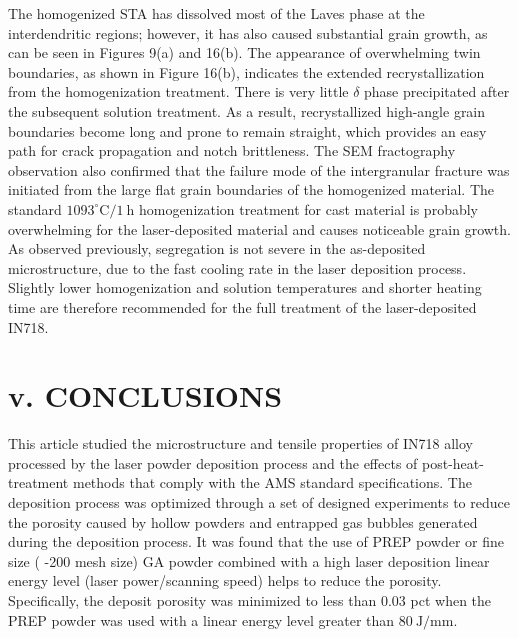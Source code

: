\documentclass[10pt]{article}
\begin{document}
The homogenized STA has dissolved most of the Laves phase at the interdendritic regions; however, it has also caused substantial grain growth, as can be seen in Figures 9(a) and 16(b). The appearance of overwhelming twin boundaries, as shown in Figure 16(b), indicates the extended recrystallization from the homogenization treatment. There is very little $\delta$ phase precipitated after the subsequent solution treatment. As a result, recrystallized high-angle grain boundaries become long and prone to remain straight, which provides an easy path for crack propagation and notch brittleness. The SEM fractography observation also confirmed that the failure mode of the intergranular fracture was initiated from the large flat grain boundaries of the homogenized material. The standard $1093^{\circ} \mathrm{C} / 1 \mathrm{~h}$ homogenization treatment for cast material is probably overwhelming for the laser-deposited material and causes noticeable grain growth. As observed previously, segregation is not severe in the as-deposited microstructure, due to the fast cooling rate in the laser deposition process. Slightly lower homogenization and solution temperatures and shorter heating time are therefore recommended for the full treatment of the laser-deposited IN718.

\section*{v. CONCLUSIONS}
This article studied the microstructure and tensile properties of IN718 alloy processed by the laser powder deposition process and the effects of post-heat-treatment methods that comply with the AMS standard specifications. The deposition process was optimized through a set of designed experiments to reduce the porosity caused by hollow powders and entrapped gas bubbles generated during the deposition process. It was found that the use of PREP powder or fine size ( -200 mesh size) GA powder combined with a high laser deposition linear energy level (laser power/scanning speed) helps to reduce the porosity. Specifically, the deposit porosity was minimized to less than 0.03 pct when the PREP powder was used with a linear energy level greater than $80 \mathrm{~J} / \mathrm{mm}$.
\end{document}

